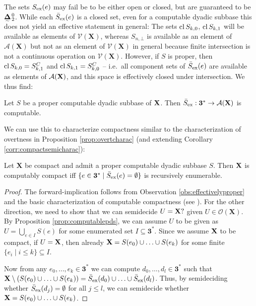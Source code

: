 \documentclass{eptcs-modified}
\begin{document}
The sets $S_{\mathrm{ex}}(e)$ may fail be to be either open or closed, but are guaranteed to be $\boldd^0_2$. While each $\bar{S}_{\mathrm{ex}}(e)$ is a closed set, even for a computable dyadic subbase this does not yield an effective statement in general: The sets $\textrm{cl}\, S_{k,0}$, $\textrm{cl}\, S_{k,1}$ will be available as elements of $\mathcal{V}(\mathbf{X})$, whereas $S_{n,\bot}$ is available as an element of $\mathcal{A}(\mathbf{X})$
but not as an element of $\mathcal{V}(\mathbf{X})$ in general because finite intersection is not a continuous operation on $\mathcal{V}(\mathbf{X})$. However, if $S$ is proper, then $\textrm{cl}\, S_{k,0} = S_{k,1}^C$ and $\textrm{cl}\, S_{k,1} = S_{k,0}^C$ -- i.e.~all component sets of $\bar{S}_{\mathrm{ex}}(e)$ are available as elements of $\mathcal{A}(\mathbf{X})$, and this space is effectively closed under intersection. We thus find:

\begin{observation}
\label{obs:effectivelyproper}
Let $S$ be a proper computable dyadic subbase of $\mathbf{X}$. Then $\bar{S}_{\mathrm{ex}} : \mathbf{3}^* \to \mathcal{A}(\mathbf{X})$ is computable.
\end{observation}

We can use this to characterize compactness similar to the characterization of overtness in Proposition \ref{prop:overtcharac} (and extending Corollary \ref{corr:compactsemicharac}):

\begin{proposition}
\label{prop:compactcharac}
Let $\mathbf{X}$ be compact and admit a proper computable dyadic subbase $S$.
Then $\mathbf{X}$ is computably compact iff $\{e \in \mathbf{3}^* \mid \bar{S}_{\mathrm{ex}}(e) = \emptyset \}$ is recursively enumerable.
\begin{proof}
The forward-implication follows from Observation \ref{obs:effectivelyproper} and the basic characterization of computable compactness (see \cite{pauly-synthetic}). For the other direction, we need to show that we can semidecide $U = \mathbf{X} ?$ given $U \in \mathcal{O}(\mathbf{X})$. By Proposition \ref{prop:computablepds}, we can assume $U$ to be given as $U = \bigcup_{e \in I} S(e)$ for some enumerated set $I \subseteq \mathbf{3}^*$. Since we assume $\mathbf{X}$ to be compact, if $U = \mathbf{X}$, then already $\mathbf{X} = S(e_0) \cup \ldots \cup S(e_k)$ for some finite $\{e_i \mid i \leq k\} \subseteq I$.

Now from any $e_0, \ldots, e_k \in \mathbf{3}^*$ we can compute $d_0,\ldots,d_{l} \in \mathbf{3}^*$ such that $\mathbf{X} \setminus \left (S(e_0) \cup \ldots \cup S(e_k) \right ) = \bar{S}_{\mathrm{ex}}(d_0) \cup \ldots \cup \bar{S}_{\mathrm{ex}}(d_l)$. Thus, by semideciding whether $\bar{S}_{\mathrm{ex}}(d_j) = \emptyset$ for all $j \leq l$, we can semidecide whether  $\mathbf{X} = S(e_0) \cup \ldots \cup S(e_k)$.
\end{proof}
\end{proposition}
\end{document}
